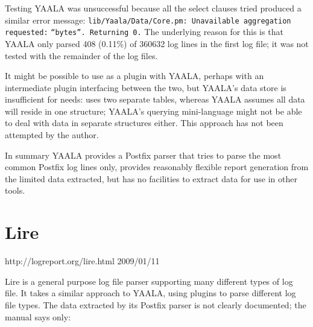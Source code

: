 Testing YAALA was unsuccessful because all the select clauses tried
produced a similar error message:
\newline{}\tab{}\texttt{lib/Yaala/Data/Core.pm: Unavailable aggregation
requested:} \newline{}\tab{}\tab{}\texttt{``bytes''. Returning 0.}
\newline{}  The underlying reason for this is that YAALA only parsed 408
(0.11\%) of 360632 log lines in the first log file; it was not tested with
the remainder of the \numberOFlogFILES{} log files.

It might be possible to use \parsername{} as a plugin with YAALA, perhaps
with an intermediate plugin interfacing between the two, but YAALA's data
store is insufficient for \parsernames{} needs: \parsername{} uses two
separate tables, whereas YAALA assumes all data will reside in one
structure; YAALA's querying mini-language might not be able to deal with
data in separate structures either.  This approach has not been attempted
by the author.

In summary YAALA provides a Postfix parser that tries to parse the most
common Postfix log lines only, provides reasonably flexible report
generation from the limited data extracted, but has no facilities to
extract data for use in other tools.

\section{Lire}

{http://logreport.org/lire.html}
{2009/01/11}

Lire is a general purpose log file parser supporting many different types
of log file.  It takes a similar approach to YAALA, using plugins to parse
different log file types.  The data extracted by its Postfix parser is not
clearly documented; the manual says only:


